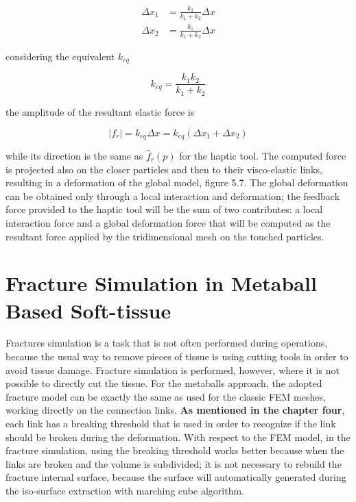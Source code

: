 \documentclass[journal]{vgtc}                %
\begin{document}
\begin{equation}
\begin{split}
\Delta x_{1} & = \frac{k_{2}}{k_{1} + k_{2}} \Delta x \\
\Delta x_{2} & = \frac{k_{1}}{k_{1} + k_{2}} \Delta x 
\end{split}
\end{equation}

considering the equivalent $k_{eq}$

\begin{equation}
k_{eq} = \frac{k_{1}k_{2}}{k_{1} + k_{2}}
\end{equation}

the amplitude of the resultant elastic force is

\begin{equation}
\left| f_{r} \right| = k_{eq} \Delta x = k_{eq}(\Delta x_{1} + \Delta x_{2})
\end{equation}

while its direction is the same as $\hat{f}_{r}(p)$ for the haptic tool. The computed force is projected also on the closer particles and then to their visco-elastic links,
resulting in a deformation of the global model, figure 5.7. The global deformation
can be obtained only through a local interaction and deformation; the feedback force
provided to the haptic tool will be the sum of two contributes: a local interaction force and a global deformation force that will be computed as the resultant force
applied by the tridimensional mesh on the touched particles.

\section{Fracture Simulation in Metaball Based Soft-tissue}

Fractures simulation is a task that is not often performed during operations, because the usual way to remove pieces of tissue is using cutting tools in order to avoid tissue damage. Fracture simulation is performed, however, where it is not possible to directly cut the tissue. For the metaballs approach, the adopted fracture model can be exactly the same as used for the classic FEM meshes, working directly on the connection links. \textbf{As mentioned in the chapter four}, each link has a breaking threshold that is used in order to recognize if the link should be broken during the deformation. With respect to the FEM model, in the fracture simulation, using the breaking threshold works better because when the links are broken and the volume is subdivided; it is not necessary to rebuild the fracture internal surface, because the surface will automatically generated during the iso-surface extraction with marching cube algorithm.
\end{document}
